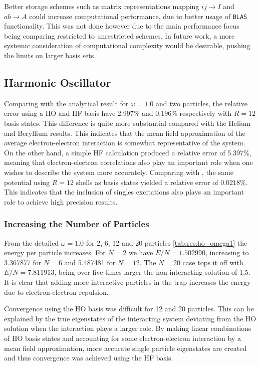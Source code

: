 Better storage schemes such as matrix representations mapping $ij \rightarrow I$ and $ab \rightarrow A$ could increase computational performance, due to better usage of \verb|BLAS| functionality. This was not done however due to the main performance focus being comparing restricted to unrestricted schemes. In future work, a more systemic consideration of computational complexity would be desirable, pushing the limits on larger basis sets.



\subsection{Harmonic Oscillator}
Comparing with the analytical result for $\omega = 1.0$ and two particles, the relative error using a HO and HF basis have 2.997\% and 0.196\% respectively with $R=12$ basis states. This difference is quite more substantial compared with the Helium and Beryllium results. This indicates that the mean field approximation of the average electron-electron interaction is somewhat representative of the system. On the other hand, a simple HF calculation produced a relative error of 5.397\%, meaning that electron-electron correlations also play an important role when one wishes to describe the system more accurately. Comparing with \citep{pedersenlohneInitioComputationEnergies2011}, the same potential using $R=12$ shells as basis states yielded a relative error of $0.0218\%$. This indicates that the inclusion of singles excitations also plays an important role to achieve high precision results.
\subsubsection{Increasing the Number of Particles}
From the detailed $\omega = 1.0$ for 2, 6, 12 and 20 particles \cref{tab:res:ho_omega1} the energy per particle increases. For $N=2$ we have $E/N = 1.502990$, increasing to 3.367877 for $N=6$ and 5.487481 for $N=12$. The $N = 20$ case tops it off with $E/N=7.811913$, being over five times larger the  non-interacting solution of 1.5. It is clear that adding more interactive particles in the trap increases the energy due to electron-electron repulsion.

Convergence using the HO basis was difficult for 12 and 20 particles. This can be explained by the true eigenstates of the interacting system deviating from the HO solution when the interaction plays a larger role. By making linear combinations of HO basis states and accounting for some electron-electron interaction by a mean field approximation, more accurate single particle eigenstates are created and thus convergence was achieved using the HF basis.

